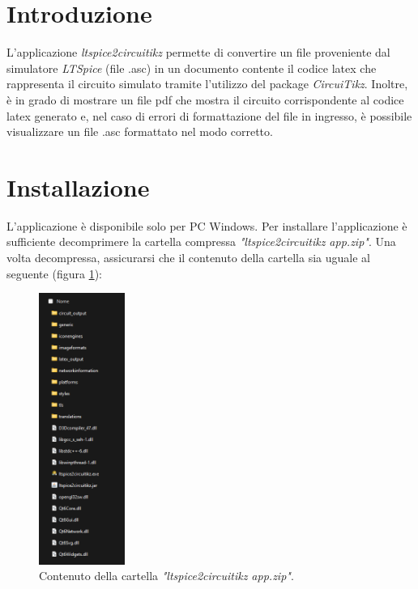 \section{Introduzione}

L'applicazione \textit{ltspice2circuitikz} permette di convertire un file proveniente dal simulatore \textit{LTSpice} (file .asc) in un documento contente il codice latex che rappresenta il circuito simulato tramite l'utilizzo del package \textit{CircuiTikz}. Inoltre, è in grado di mostrare un file pdf che mostra il circuito corrispondente al codice latex generato e, nel caso di errori di formattazione del file in ingresso, è possibile visualizzare un file .asc formattato nel modo corretto. 

\section{Installazione}
L'applicazione è disponibile solo per PC Windows. Per installare l'applicazione è sufficiente decomprimere la cartella compressa \textit{"ltspice2circuitikz app.zip"}. Una volta decompressa, assicurarsi che il contenuto della cartella sia uguale al seguente (figura \ref{fig:contenuto}):

\begin{figure}[h!]
	\centering
	\includegraphics[width=0.25\textwidth]{./ImageFiles/contenuto.png}
	\caption{Contenuto della cartella \textit{"ltspice2circuitikz app.zip"}.}
	\label{fig:contenuto}
\end{figure}

